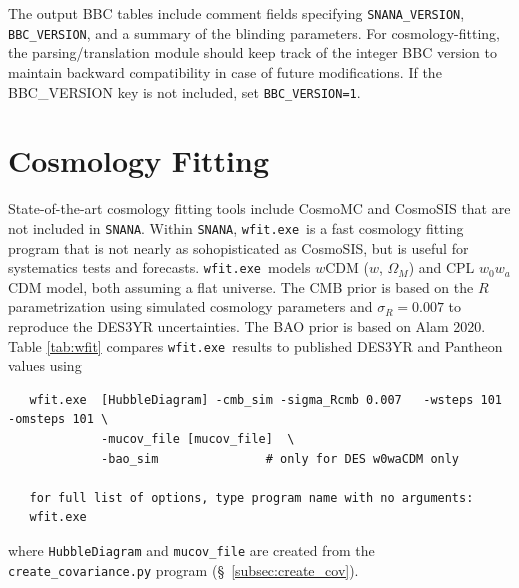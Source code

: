 \documentclass[12pt]{article}
\newcommand{\crcov}{{\tt create\_covariance.py}}
\newcommand{\snana}{{\tt SNANA}}
\newcommand{\OM}{\Omega_M}
\begin{document}
The output BBC tables include comment fields specifying
{\tt SNANA\_VERSION},  {\tt BBC\_VERSION},
and a summary of the blinding parameters. 
For cosmology-fitting, the parsing/translation module
should keep track of the integer BBC version to maintain 
backward compatibility in case of future modifications.
If the {BBC\_VERSION} key is not included, set {\tt BBC\_VERSION=1}.

   \clearpage
   \section{Cosmology Fitting}
   \label{sec:wfit}

\newcommand{\wfit}{{\tt wfit.exe}}
\newcommand{\de}{{$w_0w_a$CDM}}

State-of-the-art cosmology fitting tools include CosmoMC and CosmoSIS
that are not included in \snana. 
Within \snana, \wfit\ is a fast cosmology fitting program that
is not nearly as sohopisticated as CosmoSIS, but is useful for 
systematics tests and forecasts. 
\wfit\ models $w$CDM ($w$, $\OM$) and CPL $w_0w_a$CDM model,
both assuming a flat universe. 
The CMB prior is based on the $R$ parametrization using simulated cosmology parameters
and $\sigma_R=0.007$ to reproduce the DES3YR uncertainties. 
The BAO prior is based on Alam 2020.
Table \ref{tab:wfit} compares \wfit\ results to published DES3YR and Pantheon values using
%
\begin{verbatim}
   wfit.exe  [HubbleDiagram] -cmb_sim -sigma_Rcmb 0.007   -wsteps 101 -omsteps 101 \
             -mucov_file [mucov_file]  \
             -bao_sim               # only for DES w0waCDM only

   for full list of options, type program name with no arguments:
   wfit.exe
\end{verbatim}
where {\tt HubbleDiagram} and {\tt mucov\_file} are created from 
the {\crcov} program (\S~\ref{subsec:create_cov}).
\end{document}
